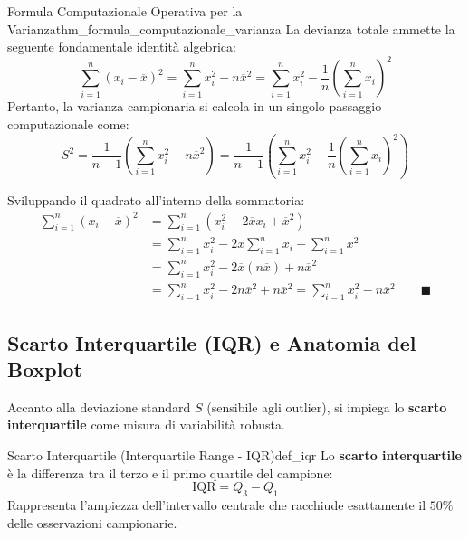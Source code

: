 \begin{teorema}{Formula Computazionale Operativa per la Varianza}{thm_formula_computazionale_varianza}
La devianza totale ammette la seguente fondamentale identità algebrica:
\begin{equation}
\sum_{i=1}^n (x_i - \overline{x})^2 = \sum_{i=1}^n x_i^2 - n\overline{x}^2 = \sum_{i=1}^n x_i^2 - \frac{1}{n}\left(\sum_{i=1}^n x_i\right)^2
\end{equation}
Pertanto, la varianza campionaria si calcola in un singolo passaggio computazionale come:
\begin{equation}
S^2 = \frac{1}{n-1}\left( \sum_{i=1}^n x_i^2 - n\overline{x}^2 \right) = \frac{1}{n-1}\left( \sum_{i=1}^n x_i^2 - \frac{1}{n}\left(\sum_{i=1}^n x_i\right)^2 \right)
\end{equation}
\end{teorema}

\begin{dimostrazione}
Sviluppando il quadrato all'interno della sommatoria:
\begin{align}
\sum_{i=1}^n (x_i - \overline{x})^2 &= \sum_{i=1}^n \left( x_i^2 - 2\overline{x}x_i + \overline{x}^2 \right) \\
&= \sum_{i=1}^n x_i^2 - 2\overline{x}\sum_{i=1}^n x_i + \sum_{i=1}^n \overline{x}^2 \\
&= \sum_{i=1}^n x_i^2 - 2\overline{x}(n\overline{x}) + n\overline{x}^2 \\
&= \sum_{i=1}^n x_i^2 - 2n\overline{x}^2 + n\overline{x}^2 = \sum_{i=1}^n x_i^2 - n\overline{x}^2 \qquad \blacksquare
\end{align}
\end{dimostrazione}

\subsection{Scarto Interquartile (IQR) e Anatomia del Boxplot}

Accanto alla deviazione standard $S$ (sensibile agli outlier), si impiega lo \textbf{scarto interquartile} come misura di variabilità robusta.

\begin{definizione}{Scarto Interquartile (Interquartile Range - IQR)}{def_iqr}
Lo \textbf{scarto interquartile} è la differenza tra il terzo e il primo quartile del campione:
\begin{equation}
\text{IQR} = Q_3 - Q_1
\end{equation}
Rappresenta l'ampiezza dell'intervallo centrale che racchiude esattamente il $50\%$ delle osservazioni campionarie.
\end{definizione}


